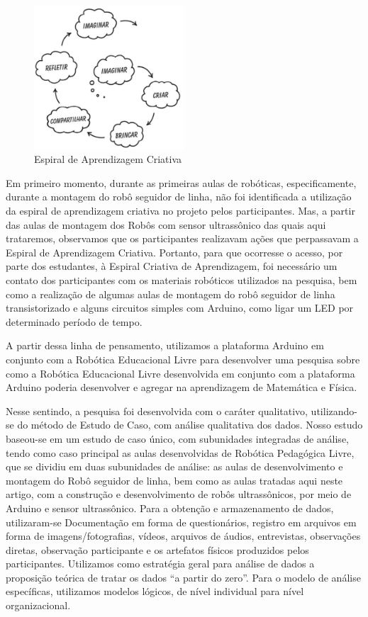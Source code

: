 \documentclass{textolivre}
\begin{document}
\begin{figure}[htbp]
 \centering
 \includegraphics[width=0.5\textwidth]{fig-001.png}
 \caption{Espiral de Aprendizagem Criativa}
 \label{fig1}
\end{figure}

Em primeiro momento, durante as primeiras aulas de robóticas, especificamente, durante a montagem do robô seguidor de linha, não foi identificada a utilização da espiral de aprendizagem criativa no projeto pelos participantes. Mas, a partir das aulas de montagem dos Robôs com sensor ultrassônico das quais aqui trataremos, observamos que os participantes realizavam ações que perpassavam a Espiral de Aprendizagem Criativa. Portanto, para que ocorresse o acesso, por parte dos estudantes, à Espiral Criativa de Aprendizagem, foi necessário um contato dos participantes com os materiais robóticos utilizados na pesquisa, bem como a realização de algumas aulas de montagem do robô seguidor de linha transistorizado e alguns circuitos simples com Arduino, como ligar um LED por determinado período de tempo.

A partir dessa linha de pensamento, utilizamos a plataforma Arduino em conjunto com a Robótica Educacional Livre para desenvolver uma pesquisa sobre como a Robótica Educacional Livre desenvolvida em conjunto com a plataforma Arduino poderia desenvolver e agregar na aprendizagem de Matemática e Física.

Nesse sentindo, a pesquisa foi desenvolvida com o caráter qualitativo, utilizando-se do método de Estudo de Caso, com análise qualitativa dos dados. Nosso estudo baseou-se em um estudo de caso único, com subunidades integradas de análise, tendo como caso principal as aulas desenvolvidas de Robótica Pedagógica Livre, que se dividiu em duas subunidades de análise: as aulas de desenvolvimento e montagem do Robô seguidor de linha, bem como as aulas tratadas aqui neste artigo, com a construção e desenvolvimento de robôs ultrassônicos, por meio de Arduino e sensor ultrassônico. Para a obtenção e armazenamento de dados, utilizaram-se Documentação em forma de questionários, registro em arquivos em forma de imagens/fotografias, vídeos, arquivos de áudios, entrevistas, observações diretas, observação participante e os artefatos físicos produzidos pelos participantes. Utilizamos como estratégia geral para análise de dados a proposição teórica de tratar os dados “a partir do zero”. Para o modelo de análise específicas, utilizamos modelos lógicos, de nível individual para nível organizacional.
\end{document}
